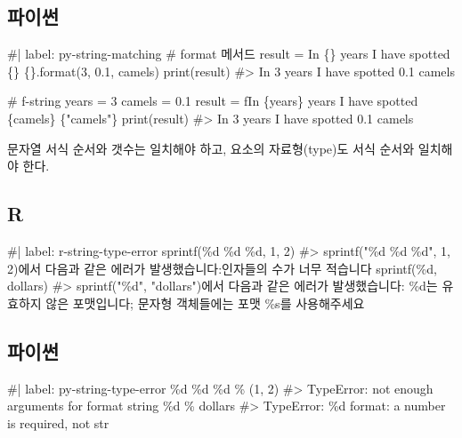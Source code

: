 \documentclass[
  letterpaper,
]{book}
\newenvironment{Shaded}{\begin{snugshade}}{\end{snugshade}}
\newcommand{\NormalTok}[1]{\textcolor[rgb]{0.00,0.23,0.31}{#1}}
\begin{document}
\subsection{파이썬}

\begin{Shaded}
\begin{Highlighting}[]
\NormalTok{\#| label: py{-}string{-}matching}
\NormalTok{\# \textasciigrave{}format\textasciigrave{} 메서드}
\NormalTok{result = \textquotesingle{}In \{\} years I have spotted \{\} \{\}\textquotesingle{}.format(3, 0.1, \textquotesingle{}camels\textquotesingle{})}
\NormalTok{print(result)}
\NormalTok{\#\textgreater{} In 3 years I have spotted 0.1 camels}

\NormalTok{\# \textasciigrave{}f{-}string\textasciigrave{}}
\NormalTok{years = 3}
\NormalTok{camels = 0.1}
\NormalTok{result = f\textquotesingle{}In \{years\} years I have spotted \{camels\} \{"camels"\}\textquotesingle{}}
\NormalTok{print(result)}
\NormalTok{\#\textgreater{} In 3 years I have spotted 0.1 camels}
\end{Highlighting}
\end{Shaded}

문자열 서식 순서와 갯수는 일치해야 하고, 요소의 자료형(type)도 서식
순서와 일치해야 한다.

\subsection{R}

\begin{Shaded}
\begin{Highlighting}[]
\NormalTok{\#| label: r{-}string{-}type{-}error}
\NormalTok{sprintf(\textquotesingle{}\%d \%d \%d\textquotesingle{}, 1, 2)}
\NormalTok{\#\textgreater{} sprintf("\%d \%d \%d", 1, 2)에서 다음과 같은 에러가 발생했습니다:인자들의 수가 너무 적습니다}
\NormalTok{sprintf(\textquotesingle{}\%d\textquotesingle{}, \textquotesingle{}dollars\textquotesingle{})}
\NormalTok{\#\textgreater{} sprintf("\%d", "dollars")에서 다음과 같은 에러가 발생했습니다: \textquotesingle{}\%d\textquotesingle{}는 유효하지 않은 포맷입니다; 문자형 객체들에는 포맷 \%s를 사용해주세요}
\end{Highlighting}
\end{Shaded}

\subsection{파이썬}

\begin{Shaded}
\begin{Highlighting}[]
\NormalTok{\#| label: py{-}string{-}type{-}error}
\NormalTok{\textquotesingle{}\%d \%d \%d\textquotesingle{} \% (1, 2)}
\NormalTok{\#\textgreater{} TypeError: not enough arguments for format string}
\NormalTok{\textquotesingle{}\%d\textquotesingle{} \% \textquotesingle{}dollars\textquotesingle{}}
\NormalTok{\#\textgreater{} TypeError: \%d format: a number is required, not str}
\end{Highlighting}
\end{Shaded}
\end{document}
